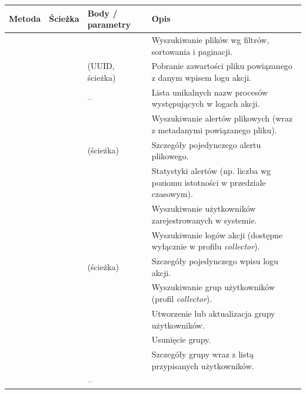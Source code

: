 \begingroup\footnotesize
\begin{longtable}{M{1.4cm} M{4.2cm} M{4.6cm} M{4.1cm}}
\toprule
{}
\textbf{Metoda} & \textbf{Ścieżka} & \textbf{Body / parametry} & \textbf{Opis} \\
\midrule
\endhead
{} &  &  &
  Wyszukiwanie plików wg filtrów, sortowania i paginacji. \\
 &  &  (UUID, ścieżka) &
  Pobranie zawartości pliku powiązanego z danym wpisem logu akcji. \\
 &  & -- &
  Lista unikalnych nazw procesów występujących w logach akcji. \\
 &  &  &
  Wyszukiwanie alertów plikowych (wraz z metadanymi powiązanego pliku). \\
 &  &  (ścieżka) &
  Szczegóły pojedynczego alertu plikowego. \\
 &  &  &
  Statystyki alertów (np. liczba wg poziomu istotności w przedziale czasowym). \\
 &  &  &
  Wyszukiwanie użytkowników zarejestrowanych w systemie. \\
 &  &  &
  Wyszukiwanie logów akcji (dostępne wyłącznie w profilu \emph{collector}). \\
 &  &  (ścieżka) &
  Szczegóły pojedynczego wpisu logu akcji. \\
 &  &  &
  Wyszukiwanie grup użytkowników (profil \emph{collector}). \\
 &  &  &
  Utworzenie lub aktualizacja grupy użytkowników. \\
 &  &  &
  Usunięcie grupy. \\
 &  &  &
  Szczegóły grupy wraz z listą przypisanych użytkowników. \\
 &  & -- &

\end{longtable}
